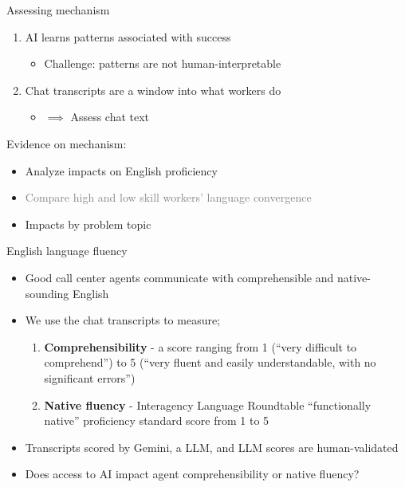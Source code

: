 \documentclass[aspectratio=169,t,11pt,table]{beamer}
\begin{document}
\begin{frame}{Assessing mechanism}
\begin{enumerate}
    \item AI learns patterns associated with success
        \begin{itemize} 
    \item[] \alert{Challenge:} patterns are not human-interpretable
    \end{itemize} 
    \medskip \pause
    \item Chat transcripts are a window into what workers do
    \begin{itemize} 
    \item[] $\implies$ Assess chat text
    \end{itemize} 
    \medskip  \pause
      \end{enumerate}
    \textcolor{raspberry}{Evidence on mechanism:}
    \begin{itemize}
    \item Analyze impacts on English proficiency
    \item \textcolor{gray}{Compare high and low skill workers' language convergence}
    \item Impacts by problem topic
      \end{itemize}
\end{frame}



\begin{frame}{English language fluency}
\begin{itemize}
    \item Good call center agents communicate with \alert{comprehensible} and \alert{native-sounding} English
    \vspace{2mm}
    \item We use the chat transcripts to measure;
    \begin{enumerate}
        \item \textbf{Comprehensibility} - a score ranging from 1 (``very difficult to comprehend'') to 5 (``very fluent and easily understandable, with no significant errors'')
        \vspace{2mm}
        \item\textbf{Native fluency} -  Interagency Language Roundtable ``functionally native'' proficiency standard score from 1 to 5 
    \end{enumerate}
    \item Transcripts scored by Gemini, a LLM, and LLM scores are human-validated
    \vspace{2mm}
    \item Does access to AI impact agent comprehensibility or native fluency?
\end{itemize}
\end{frame}
\end{document}
